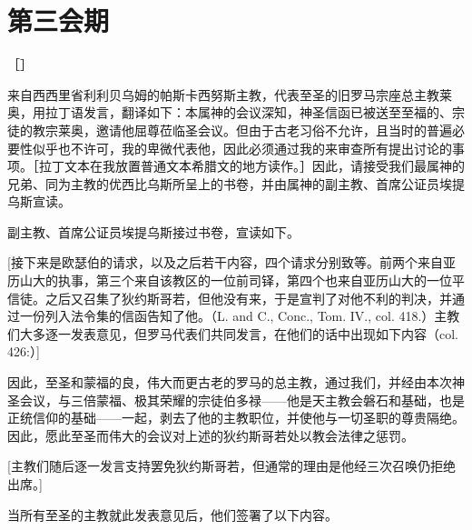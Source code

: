
\section{第三会期}

［］\par

来自西西里省利利贝乌姆的帕斯卡西努斯主教，代表至圣的旧罗马宗座总主教莱奥，用拉丁语发言，翻译如下：本属神的会议深知，神圣信函已被送至至福的、宗徒的教宗莱奥，邀请他屈尊莅临圣会议。但由于古老习俗不允许，且当时的普遍必要性似乎也不许可，我的卑微代表他，因此必须通过我的来审查所有提出讨论的事项。［拉丁文本在我放置普通文本希腊文的地方读作。］因此，请接受我们最属神的兄弟、同为主教的优西比乌斯所呈上的书卷，并由属神的副主教、首席公证员埃提乌斯宣读。\par

副主教、首席公证员埃提乌斯接过书卷，宣读如下。\par

[接下来是欧瑟伯的请求，以及之后若干内容，四个请求分别致等。前两个来自亚历山大的执事，第三个来自该教区的一位前司铎，第四个也来自亚历山大的一位平信徒。之后又召集了狄约斯哥若，但他没有来，于是宣判了对他不利的判决，并通过一份列入法令集的信函告知了他。（L. and C., Conc., Tom. IV., col. 418.）主教们大多逐一发表意见，但罗马代表们共同发言，在他们的话中出现如下内容（col. 426:）]\par

因此，至圣和蒙福的良，伟大而更古老的罗马的总主教，通过我们，并经由本次神圣会议，与三倍蒙福、极其荣耀的宗徒伯多禄——他是天主教会磐石和基础，也是正统信仰的基础——一起，剥去了他的主教职位，并使他与一切圣职的尊贵隔绝。因此，愿此至圣而伟大的会议对上述的狄约斯哥若处以教会法律之惩罚。\par

[主教们随后逐一发言支持罢免狄约斯哥若，但通常的理由是他经三次召唤仍拒绝出席。]\par

当所有至圣的主教就此发表意见后，他们签署了以下内容。\par

\par

